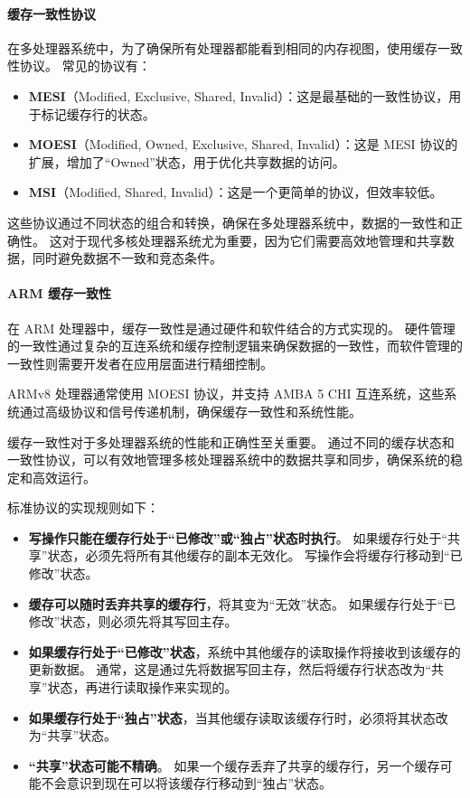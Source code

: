 \begin{Tcbox}[title={扩展}]

\paragraph*{缓存一致性协议}

在多处理器系统中，为了确保所有处理器都能看到相同的内存视图，使用缓存一致性协议。
常见的协议有：

\begin{itemize}

\item
  \textbf{MESI}（Modified, Exclusive, Shared, Invalid）：这是最基础的一致性协议，用于标记缓存行的状态。
\item
  \textbf{MOESI}（Modified, Owned, Exclusive, Shared, Invalid）：这是 MESI 协议的扩展，增加了“Owned”状态，用于优化共享数据的访问。
\item
  \textbf{MSI}（Modified, Shared, Invalid）：这是一个更简单的协议，但效率较低。
\end{itemize}

这些协议通过不同状态的组合和转换，确保在多处理器系统中，数据的一致性和正确性。
这对于现代多核处理器系统尤为重要，因为它们需要高效地管理和共享数据，同时避免数据不一致和竞态条件。

\paragraph*{ARM 缓存一致性}

在 ARM 处理器中，缓存一致性是通过硬件和软件结合的方式实现的。
硬件管理的一致性通过复杂的互连系统和缓存控制逻辑来确保数据的一致性，而软件管理的一致性则需要开发者在应用层面进行精细控制。

ARMv8 处理器通常使用 MOESI 协议，并支持 AMBA 5 CHI 互连系统，这些系统通过高级协议和信号传递机制，确保缓存一致性和系统性能。

缓存一致性对于多处理器系统的性能和正确性至关重要。
通过不同的缓存状态和一致性协议，可以有效地管理多核处理器系统中的数据共享和同步，确保系统的稳定和高效运行。

\end{Tcbox}

标准协议的实现规则如下：

\begin{itemize}
\item
  \textbf{写操作只能在缓存行处于“已修改”或“独占”状态时执行}。
  如果缓存行处于“共享”状态，必须先将所有其他缓存的副本无效化。
  写操作会将缓存行移动到“已修改”状态。
\item
  \textbf{缓存可以随时丢弃共享的缓存行}，将其变为“无效”状态。
  如果缓存行处于“已修改”状态，则必须先将其写回主存。
\item
  \textbf{如果缓存行处于“已修改”状态}，系统中其他缓存的读取操作将接收到该缓存的更新数据。
  通常，这是通过先将数据写回主存，然后将缓存行状态改为“共享”状态，再进行读取操作来实现的。
\item
  \textbf{如果缓存行处于“独占”状态}，当其他缓存读取该缓存行时，必须将其状态改为“共享”状态。
\item
  \textbf{“共享”状态可能不精确}。
  如果一个缓存丢弃了共享的缓存行，另一个缓存可能不会意识到现在可以将该缓存行移动到“独占”状态。
\end{itemize}

